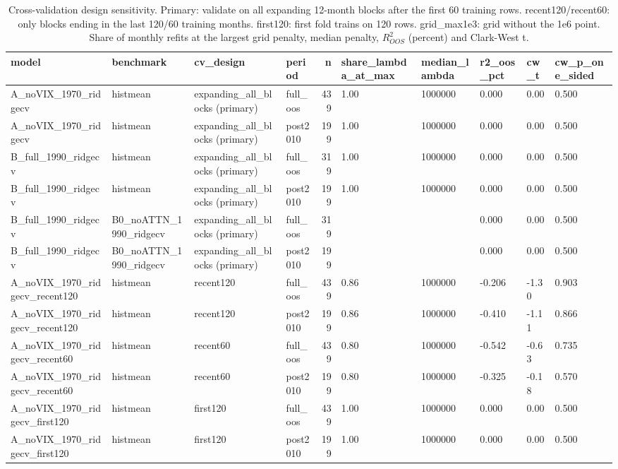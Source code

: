 \begin{table}
\caption{Cross-validation design sensitivity. Primary: validate on all expanding 12-month blocks after the first 60 training rows. recent120/recent60: only blocks ending in the last 120/60 training months. first120: first fold trains on 120 rows. grid\_max1e3: grid without the 1e6 point. Share of monthly refits at the largest grid penalty, median penalty, $R^2_{OOS}$ (percent) and Clark-West t.}
\label{tab:m6_cv_design}
\begin{tabular}{llllrlllll}
\toprule
model & benchmark & cv\_design & period & n & share\_lambda\_at\_max & median\_lambda & r2\_oos\_pct & cw\_t & cw\_p\_one\_sided \\
\midrule
A\_noVIX\_1970\_ridgecv & histmean & expanding\_all\_blocks (primary) & full\_oos & 439 & 1.00 & 1000000 & 0.000 & 0.00 & 0.500 \\
A\_noVIX\_1970\_ridgecv & histmean & expanding\_all\_blocks (primary) & post2010 & 199 & 1.00 & 1000000 & 0.000 & 0.00 & 0.500 \\
B\_full\_1990\_ridgecv & histmean & expanding\_all\_blocks (primary) & full\_oos & 319 & 1.00 & 1000000 & 0.000 & 0.00 & 0.500 \\
B\_full\_1990\_ridgecv & histmean & expanding\_all\_blocks (primary) & post2010 & 199 & 1.00 & 1000000 & 0.000 & 0.00 & 0.500 \\
B\_full\_1990\_ridgecv & B0\_noATTN\_1990\_ridgecv & expanding\_all\_blocks (primary) & full\_oos & 319 &  &  & 0.000 & 0.00 & 0.500 \\
B\_full\_1990\_ridgecv & B0\_noATTN\_1990\_ridgecv & expanding\_all\_blocks (primary) & post2010 & 199 &  &  & 0.000 & 0.00 & 0.500 \\
A\_noVIX\_1970\_ridgecv\_recent120 & histmean & recent120 & full\_oos & 439 & 0.86 & 1000000 & -0.206 & -1.30 & 0.903 \\
A\_noVIX\_1970\_ridgecv\_recent120 & histmean & recent120 & post2010 & 199 & 0.86 & 1000000 & -0.410 & -1.11 & 0.866 \\
A\_noVIX\_1970\_ridgecv\_recent60 & histmean & recent60 & full\_oos & 439 & 0.80 & 1000000 & -0.542 & -0.63 & 0.735 \\
A\_noVIX\_1970\_ridgecv\_recent60 & histmean & recent60 & post2010 & 199 & 0.80 & 1000000 & -0.325 & -0.18 & 0.570 \\
A\_noVIX\_1970\_ridgecv\_first120 & histmean & first120 & full\_oos & 439 & 1.00 & 1000000 & 0.000 & 0.00 & 0.500 \\
A\_noVIX\_1970\_ridgecv\_first120 & histmean & first120 & post2010 & 199 & 1.00 & 1000000 & 0.000 & 0.00 & 0.500 \\

\end{tabular}
\end{table}
